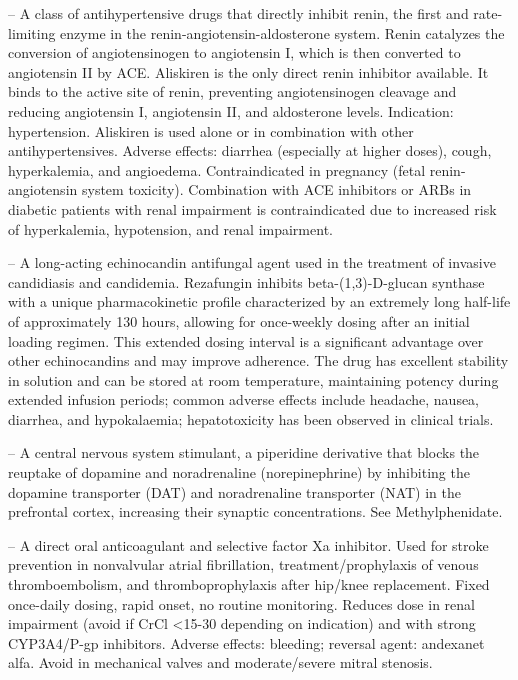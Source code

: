 -- A class of antihypertensive drugs that directly inhibit renin, the first and rate-limiting enzyme in the renin-angiotensin-aldosterone system. Renin catalyzes the conversion of angiotensinogen to angiotensin I, which is then converted to angiotensin II by ACE. Aliskiren is the only direct renin inhibitor available. It binds to the active site of renin, preventing angiotensinogen cleavage and reducing angiotensin I, angiotensin II, and aldosterone levels. Indication: hypertension. Aliskiren is used alone or in combination with other antihypertensives. Adverse effects: diarrhea (especially at higher doses), cough, hyperkalemia, and angioedema. Contraindicated in pregnancy (fetal renin-angiotensin system toxicity). Combination with ACE inhibitors or ARBs in diabetic patients with renal impairment is contraindicated due to increased risk of hyperkalemia, hypotension, and renal impairment.

-- A long-acting echinocandin antifungal agent used in the treatment of invasive candidiasis and candidemia. Rezafungin inhibits beta-(1,3)-D-glucan synthase with a unique pharmacokinetic profile characterized by an extremely long half-life of approximately 130 hours, allowing for once-weekly dosing after an initial loading regimen. This extended dosing interval is a significant advantage over other echinocandins and may improve adherence. The drug has excellent stability in solution and can be stored at room temperature, maintaining potency during extended infusion periods; common adverse effects include headache, nausea, diarrhea, and hypokalaemia; hepatotoxicity has been observed in clinical trials.

-- A central nervous system stimulant, a piperidine derivative that blocks the reuptake of dopamine and noradrenaline (norepinephrine) by inhibiting the dopamine transporter (DAT) and noradrenaline transporter (NAT) in the prefrontal cortex, increasing their synaptic concentrations. See Methylphenidate.

-- A direct oral anticoagulant and selective factor Xa inhibitor. Used for stroke prevention in nonvalvular atrial fibrillation, treatment/prophylaxis of venous thromboembolism, and thromboprophylaxis after hip/knee replacement. Fixed once-daily dosing, rapid onset, no routine monitoring. Reduces dose in renal impairment (avoid if CrCl <15-30 depending on indication) and with strong CYP3A4/P-gp inhibitors. Adverse effects: bleeding; reversal agent: andexanet alfa. Avoid in mechanical valves and moderate/severe mitral stenosis.


